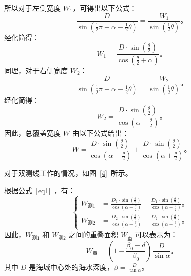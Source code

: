 \documentclass[withoutpreface,bwprint]{cumcmthesis} %
\begin{document}
    所以对于左侧宽度 $W_1$，可得出以下公式：
    \begin{equation}
        \frac{D}{\sin\left(\frac{1}{2}\pi - \alpha - \frac{1}{2}\theta\right)} = \frac{W_1}{\sin\left(\frac{1}{2}\theta\right)} \text{。}
    \end{equation}
    经化简得：
    \begin{equation}
        W_1 = \frac{D \cdot \sin\left(\frac{\theta}{2}\right)}{\cos\left(\frac{\theta}{2}+\alpha\right)} \text{。}
    \end{equation}
    同理，对于右侧宽度 $W_2$：
    \begin{equation}
        \frac{D}{\sin\left(\frac{1}{2}\pi + \alpha - \frac{1}{2}\theta\right)} = \frac{W_2}{\sin\left(\frac{1}{2}\theta\right)} \text{。}
    \end{equation}
    经化简得：
    \begin{equation}
        W_2 = \frac{D \cdot \sin\left(\frac{\theta}{2}\right)}{\cos\left(\alpha - \frac{\theta}{2}\right)} \text{。}
    \end{equation}
    因此，总覆盖宽度 $W$ 由以下公式给出：
    \begin{equation}
        W = \frac{D \cdot \sin\left(\frac{\theta}{2}\right)}{\cos\left(\alpha - \frac{\theta}{2}\right)} + \frac{D \cdot \sin\left(\frac{\theta}{2}\right)}{\cos\left(\alpha + \frac{\theta}{2}\right)} \text{。}
        \label{eq1}
    \end{equation}

    对于双测线工作的情况，如图~\ref{4}~所示。
        
    
    根据公式~\eqref{eq1}~，有：
    \begin{equation}
        \left\{
        \begin{aligned}
            W_\text{测1} &= \frac{D_1 \cdot \sin\left(\frac{\theta}{2}\right)}{\cos\left(\alpha - \frac{\theta}{2}\right)} + \frac{D_1 \cdot \sin\left(\frac{\theta}{2}\right)}{\cos\left(\alpha + \frac{\theta}{2}\right)} \text{。}\\
            W_\text{测2} &= \frac{D_2 \cdot \sin\left(\frac{\theta}{2}\right)}{\cos\left(\alpha - \frac{\theta}{2}\right)} + \frac{D_2 \cdot \sin\left(\frac{\theta}{2}\right)}{\cos\left(\alpha + \frac{\theta}{2}\right)} \text{。}
        \end{aligned}
        \right.
    \end{equation}    
    因此，$W_\text{测1}$ 和 $W_\text{测2}$ 之间的重叠面积 $W_\text{重}$ 可以表示为：
    \begin{equation}
        W_\text{重} = \left(1 - \frac{\beta_0 - d}{\beta_0}\right) \frac{D}{\sin\alpha} \text{。}
    \end{equation}
    其中 $D$ 是海域中心处的海水深度，$\beta = \frac{D}{\tan\alpha}$。
    
\end{document}

